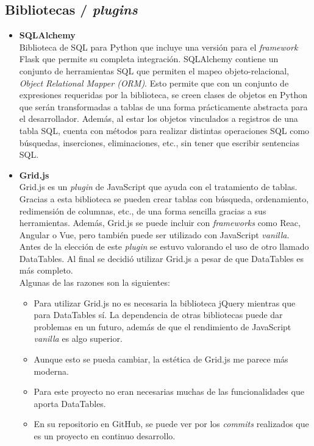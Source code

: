 \subsection{Bibliotecas / \textit{plugins}}
\begin{itemize}
\item\textbf{SQLAlchemy}\\
Biblioteca de SQL para Python que incluye una versión para el \textit{framework} Flask que permite su completa integración. SQLAlchemy contiene un conjunto de herramientas SQL que permiten el mapeo objeto-relacional, \textit{Object Relational Mapper (ORM)}. Esto permite que con un conjunto de expresiones requeridas por la biblioteca, se creen clases de objetos en Python que serán transformadas a tablas de una forma prácticamente abstracta para el desarrollador. Además, al estar los objetos vinculados a registros de una tabla SQL, cuenta con métodos para realizar distintas operaciones SQL como búsquedas, inserciones, eliminaciones, etc., sin tener que escribir sentencias SQL.\cite{sqlAlchemy}

\item\textbf{Grid.js}\\
Grid.js es un \textit{plugin} de JavaScript que ayuda con el tratamiento de tablas. Gracias a esta biblioteca se pueden crear tablas con búsqueda, ordenamiento, redimensión de columnas, etc., de una forma sencilla gracias a sus herramientas. Además, Grid.js se puede incluir con \textit{frameworks} como Reac, Angular o Vue, pero también puede ser utilizado con JavaScript \textit{vanilla}.\\
Antes de la elección de este \textit{plugin} se estuvo valorando el uso de otro llamado DataTables. Al final se decidió utilizar Grid.js a pesar de que DataTables es más completo.\\
Algunas de las razones son la siguientes:
\begin{itemize}
\item Para utilizar Grid.js no es necesaria la biblioteca jQuery mientras que para DataTables sí. La dependencia de otras bibliotecas puede dar problemas en un futuro, además de que el rendimiento de JavaScript \textit{vanilla} es algo superior.
\item Aunque esto se pueda cambiar, la estética de Grid.js me parece más moderna.
\item Para este proyecto no eran necesarias muchas de las funcionalidades que aporta DataTables.
\item En su repositorio en GitHub, se puede ver por los \textit{commits} realizados que es un proyecto en continuo desarrollo.
\end{itemize}
\end{itemize}

